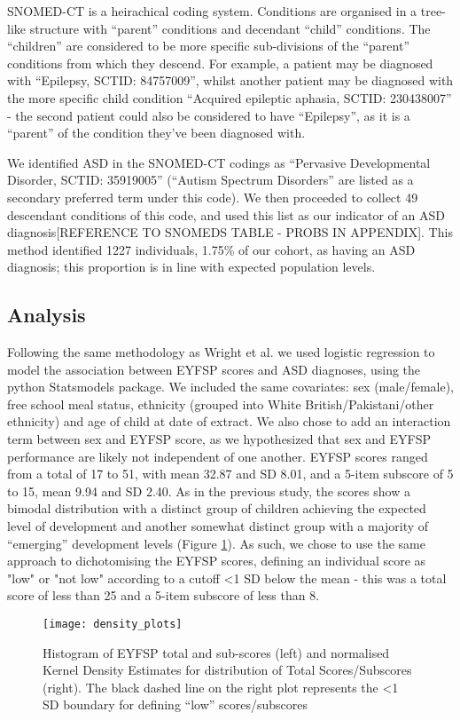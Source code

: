 SNOMED-CT is a heirachical coding system. Conditions are organised in a tree-like structure with ``parent'' conditions and decendant ``child'' conditions. The ``children'' are considered to be more specific sub-divisions of the ``parent'' conditions from which they descend. For example, a patient may be diagnosed with ``Epilepsy, SCTID: 84757009'', whilst another patient may be diagnosed with the more specific child condition ``Acquired epileptic aphasia, SCTID: 230438007'' - the second patient could also be considered to have ``Epilepsy'', as it is a ``parent'' of the condition they've been diagnosed with.

We identified ASD in the SNOMED-CT codings as ``Pervasive Developmental Disorder, SCTID: 35919005'' (``Autism Spectrum Disorders'' are listed as a secondary preferred term under this code). We then proceeded to collect 49 descendant conditions of this code, and used this list as our indicator of an ASD diagnosis[REFERENCE TO SNOMEDS TABLE - PROBS IN APPENDIX]. This method identified 1227 individuals, 1.75\% of our cohort, as having an ASD diagnosis; this proportion is in line with expected population levels.

\subsection{Analysis}

Following the same methodology as Wright et al. we used logistic regression to model the association between EYFSP scores and ASD diagnoses, using the python Statsmodels package\cite{statsmodels}. We included the same covariates: sex (male/female), free school meal status, ethnicity (grouped into White British/Pakistani/other ethnicity) and age of child at date of extract. We also chose to add an interaction term between sex and EYFSP score, as we hypothesized that sex and EYFSP performance are likely not independent of one another.
EYFSP scores ranged from a total of 17 to 51, with mean 32.87 and SD 8.01, and a 5-item subscore of 5 to 15, mean 9.94 and SD 2.40. As in the previous study, the scores show a bimodal distribution with a distinct group of children achieving the expected level of development and another somewhat distinct group with a majority of ``emerging'' development levels (Figure \ref{fig:density_plots}). As such, we chose to use the same approach to dichotomising the EYFSP scores, defining an individual score as "low" or "not low" according to a cutoff \textless  1 SD below the mean - this was a total score of less than 25 and a 5-item subscore of less than 8.

\begin{figure}[h]
    \centering
    \texttt{[image: density\_plots]}
    \caption{Histogram of EYFSP total and sub-scores (left) and normalised Kernel Density Estimates for distribution of Total Scores/Subscores (right). The black dashed line on the right plot represents the \textless1 SD boundary for defining ``low'' scores/subscores}
    \label{fig:density_plots}
\end{figure}

\newpage

